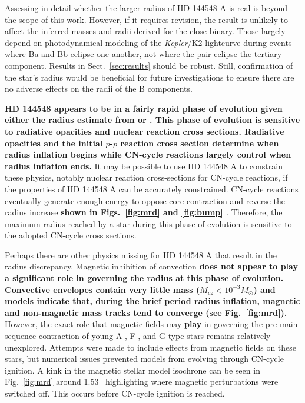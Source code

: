 \documentclass{aa}
\begin{document}
Assessing in detail whether the larger radius of HD 144548 A is real is beyond the scope of this work. However, if it requires revision, the result is unlikely to affect the inferred masses and radii derived for the close binary. Those largely depend on photodynamical modeling of the \emph{Kepler}/K2 lightcurve during events where Ba and Bb eclipse one another, not where the pair eclipse the tertiary component. Results in Sect.~\ref{sec:results} should be robust. Still, confirmation of the star's radius would be beneficial for future investigations to ensure there are no adverse effects on the radii of the B components. 

{\bf HD 144548 appears to be in a fairly rapid phase of evolution given either the radius estimate from \cite{Pecaut2012} or \citet{Alonso2015}. This phase of evolution is sensitive to radiative opacities and nuclear reaction cross sections. Radiative opacities and the initial $p$-$p$ reaction cross section determine when radius inflation begins while CN-cycle reactions largely control when radius inflation ends.} It may be possible to use HD 144548 A to constrain these physics, notably nuclear reaction cross-sections for CN-cycle reactions, if the properties of HD 144548 A can be accurately constrained. CN-cycle reactions eventually generate enough energy to oppose core contraction and reverse the radius increase {\bf shown in Figs.\ \ref{fig:mrd} and \ref{fig:bump} \citep[also see][]{Stassun2014}}. Therefore, the maximum radius reached by a star during this phase of evolution is sensitive to the adopted CN-cycle cross sections. 

Perhaps there are other physics missing for HD 144548 A that result in the radius discrepancy. Magnetic inhibition of convection {\bf does not appear to play a significant role in governing the radius at this phase of evolution. Convective envelopes contain very little mass ($M_{cz} < 10^{-3} M_{\odot}$) and models indicate that, during the brief period radius inflation, magnetic and non-magnetic mass tracks tend to converge (see Fig.~\ref{fig:mrd}).} However, the exact role that magnetic fields may {\bf play} in governing the pre-main-sequence contraction of young A-, F-, and G-type stars remains relatively unexplored. Attempts were made to include effects from magnetic fields on these stars, but numerical issues prevented models from evolving through CN-cycle ignition. A kink in the magnetic stellar model isochrone can be seen in Fig.\ \ref{fig:mrd} around 1.53 \msun\ highlighting where magnetic perturbations were switched off. This occurs before CN-cycle ignition is reached.  
\end{document}
